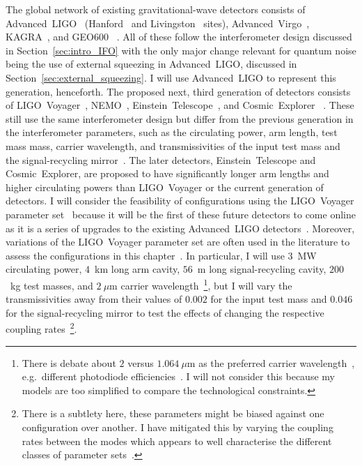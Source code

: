 The global network of existing gravitational-wave detectors consists of Advanced~LIGO~\cite{} (Hanford~\cite{} and Livingston~\cite{} sites), Advanced~Virgo~\cite{}, KAGRA~\cite{}, and GEO600~\cite{} . All of these follow the interferometer design discussed in Section~\ref{sec:intro_IFO} with the only major change relevant for quantum noise  being the use of external squeezing in Advanced~LIGO, discussed in Section~\ref{sec:external_squeezing}. I will use Advanced~LIGO to represent this generation, henceforth. 
The proposed next, third generation of  detectors consists of LIGO~Voyager~\cite{}, NEMO~\cite{}, Einstein~Telescope~\cite{}, and Cosmic~Explorer~\cite{} . These still use the same interferometer design   but differ from the previous generation in the interferometer parameters, such as the circulating power, arm length, test mass mass, carrier wavelength, and transmissivities of the input test mass and the signal-recycling mirror~\cite{}. 
The later detectors, Einstein~Telescope and Cosmic~Explorer, are proposed to have significantly longer arm lengths and higher circulating powers than LIGO~Voyager or the current generation of detectors. 
I will consider the feasibility of configurations using the LIGO~Voyager parameter set~\cite{} because it will be the first of these future detectors to come online as it is a series of upgrades to the existing Advanced~LIGO detectors~\cite{}. Moreover, variations of the LIGO~Voyager parameter set are often used in the literature to assess the configurations in this chapter~\cite{Li2020,Miao2018,Korobko,}. In particular, I will use $3$~MW circulating power, $4$~km long arm cavity, $56$~m long signal-recycling cavity, $200$~kg test masses, and $2~\mu\text{m}$ carrier wavelength~\footnote{There is debate about $2$ versus $1.064~\mu\text{m}$ as the preferred carrier wavelength~\cite{}, e.g.\ different photodiode efficiencies~\cite{}. I will not consider this because my models are too simplified to compare the technological constraints.}, but I will vary the transmissivities away from their values of $0.002$ for the input test mass and $0.046$ for the signal-recycling mirror to test the effects of changing the respective coupling rates~\footnote{There is a subtlety here, these parameters might be biased against one configuration over another. I have mitigated this by varying the coupling rates between the modes which appears to well characterise the different classes of parameter sets~\cite{}.}. 

